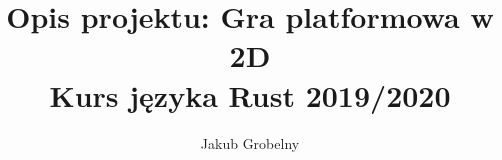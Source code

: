 \documentclass[12pt, a4paper, oneside]{article}
\title{%
    Opis projektu: Gra platformowa w 2D \\
    \large Kurs języka Rust 2019/2020
}
\author{Jakub Grobelny}
\date{}
\begin{document}
\begin{titlepage}
    \maketitle
\end{titlepage}
\end{document}
